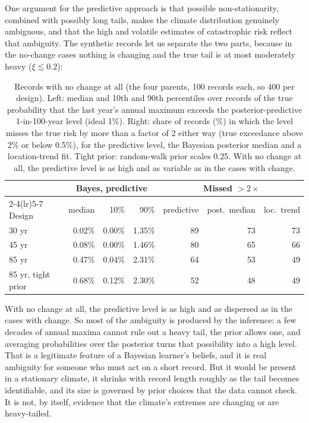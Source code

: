 \documentclass[11pt]{article}
\begin{document}
One argument for the predictive approach is that possible non-stationarity, combined with possibly
long tails, makes the climate distribution genuinely ambiguous, and that the high and volatile
estimates of catastrophic risk reflect that ambiguity. The synthetic records let us separate the
two parts, because in the no-change cases nothing is changing and the true tail is at most moderately heavy
($\xi\lesssim0.2$):

\begin{table}[H]
\centering\small
\caption{Records with no change at all (the four parents, 100 records each, so 400 per design). Left: median and 10th and 90th percentiles over records of the true probability that the last year's annual maximum exceeds the posterior-predictive 1-in-100-year level (ideal 1\%). Right: share of records (\%) in which the level misses the true risk by more than a factor of 2 either way (true exceedance above 2\% or below 0.5\%), for the predictive level, the Bayesian posterior median and a location-trend fit. Tight prior: random-walk prior scales 0.25. With no change at all, the predictive level is as high and as variable as in the cases with change.}\label{tab:pred-null}
\begin{tabular}{l rrr rrr}
\toprule
 & \multicolumn{3}{c}{Bayes, predictive} & \multicolumn{3}{c}{Missed $>2\times$} \\
\cmidrule(lr){2-4}\cmidrule(lr){5-7}
Design & median & 10\% & 90\% & predictive & post.\ median & loc.\ trend \\
\midrule
30 yr & 0.02\% & 0.00\% & 1.35\% & 89 & 73 & 73 \\
45 yr & 0.08\% & 0.00\% & 1.46\% & 80 & 65 & 66 \\
85 yr & 0.47\% & 0.04\% & 2.31\% & 64 & 53 & 49 \\
85 yr, tight prior & 0.68\% & 0.12\% & 2.30\% & 52 & 48 & 49 \\
\bottomrule
\end{tabular}
\end{table}

With no change at all, the predictive level is as high and as dispersed as in the cases with
change. So most of the ambiguity is produced by the inference: a few decades of annual maxima
cannot rule out a heavy tail, the prior allows one, and averaging probabilities over the posterior
turns that possibility into a high level. That is a legitimate feature of a Bayesian learner's
beliefs, and it is real ambiguity for someone who must act on a short record. But it would be
present in a stationary climate, it shrinks with record length roughly as the tail becomes
identifiable, and its size is governed by prior choices that the data cannot check. It is not, by
itself, evidence that the climate's extremes are changing or are heavy-tailed.
\end{document}
